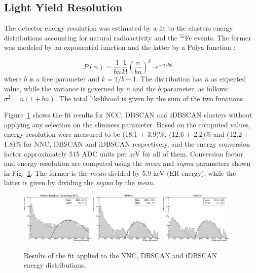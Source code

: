 \documentclass[a4paper,11pt]{article}
\begin{document}
\subsection{Light Yield Resolution}\label{subsec:detres}

The detector energy resolution was estimated by a fit to the clusters energy distributions accounting for natural radioactivity and the $^{55}$Fe events. The former was modeled by an exponential function and the latter by a Polya function \cite{bib:rolandiblum}:

\begin{equation}
   P(n)=\frac{1}{b\overline{n}}\frac{1}{k!}\left(\frac{n}{b\overline{n}}\right)^k \cdot e^{-n/b\overline{n}}
\label{fun:polya}
\end{equation}
where $b$ is a free parameter and $k=1/b-1$. The distribution has $\overline{n}$ as expected value, while the variance is governed by $\overline{n}$ and the $b$ parameter, as follows: $\sigma^2=\overline{n}(1+b\overline{n})$. The total likelihood is given by the sum of the two functions.



Figure~\ref{fig_CosFe} shows the fit results for NCC, DBSCAN and iDBSCAN clusters without applying any selection on the slimness parameter.
Based on the computed values, energy resolution were measured to be (18.1 $\pm$ 3.9)\%, (12.6 $\pm$ 2.2)\% and (12.2 $\pm$ 1.8)\% for NNC, DBSCAN and iDBSCAN respectively, and the energy conversion factor approximately 515 ADC units per keV for all of them.
Conversion factor and energy resolution are computed using the \textit{mean} and \textit{sigma} parameters shown in Fig.~\ref{fig_CosFe}. 
The former is the \textit{mean} divided by 5.9 keV (ER energy), while the latter is given by dividing the \textit{sigma} by the \textit{mean}.


\begin{figure}[ht]
\centering
\includegraphics[width=0.32\textwidth]{log_Resolution_NNC_0.pdf}
\includegraphics[width=0.32\textwidth]{log_Resolution_DBN_0.pdf}
\includegraphics[width=0.32\textwidth]{log_Resolution_IDB_0.pdf}
\caption{Results of the fit applied to the NNC, DBSCAN and iDBSCAN energy distributions.}
\label{fig_CosFe}
\end{figure}
\end{document}
